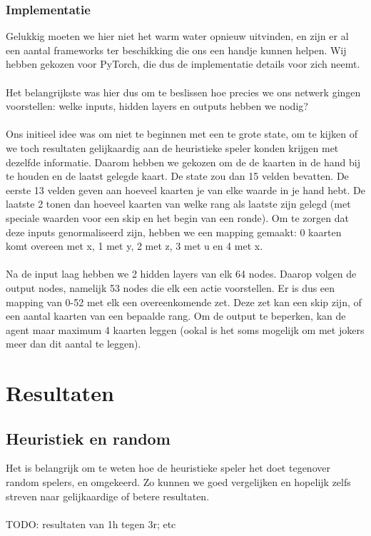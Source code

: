 \documentclass[11pt]{article}
\begin{document}
\subsubsection{Implementatie}
Gelukkig moeten we hier niet het warm water opnieuw uitvinden, en zijn er al een aantal frameworks ter beschikking die ons een handje kunnen helpen. Wij hebben gekozen voor PyTorch, die dus de implementatie details voor zich neemt.\\\\
Het belangrijkste was hier dus om te beslissen hoe precies we ons netwerk gingen voorstellen: welke inputs, hidden layers en outputs hebben we nodig?\\\\
Ons initieel idee was om niet te beginnen met een te grote state, om te kijken of we toch resultaten gelijkaardig aan de heuristieke speler konden krijgen met dezelfde informatie. Daarom hebben we gekozen om de de kaarten in de hand bij te houden en de laatst gelegde kaart. De state zou dan 15 velden bevatten. De eerste 13 velden geven aan hoeveel kaarten je van elke waarde in je hand hebt. De laatste 2 tonen dan hoeveel kaarten van welke rang als laatste zijn gelegd (met speciale waarden voor een skip en het begin van een ronde). Om te zorgen dat deze inputs genormaliseerd zijn, hebben we een mapping gemaakt: 0 kaarten komt overeen met x, 1 met y, 2 met z, 3 met u en 4 met x.\\\\
Na de input laag hebben we 2 hidden layers van elk 64 nodes. Daarop volgen de output nodes, namelijk 53 nodes die elk een actie voorstellen. Er is dus een mapping van 0-52 met elk een overeenkomende zet. Deze zet kan een skip zijn, of een aantal kaarten van een bepaalde rang. Om de output te beperken, kan de agent maar maximum 4 kaarten leggen (ookal is het soms mogelijk om met jokers meer dan dit aantal te leggen).

\newpage
\section{Resultaten}

\subsection{Heuristiek en random}
Het is belangrijk om te weten hoe de heuristieke speler het doet tegenover random spelers, en omgekeerd. Zo kunnen we goed vergelijken en hopelijk zelfs streven naar gelijkaardige of betere resultaten.\\\\
TODO: resultaten van 1h tegen 3r; etc
\end{document}
